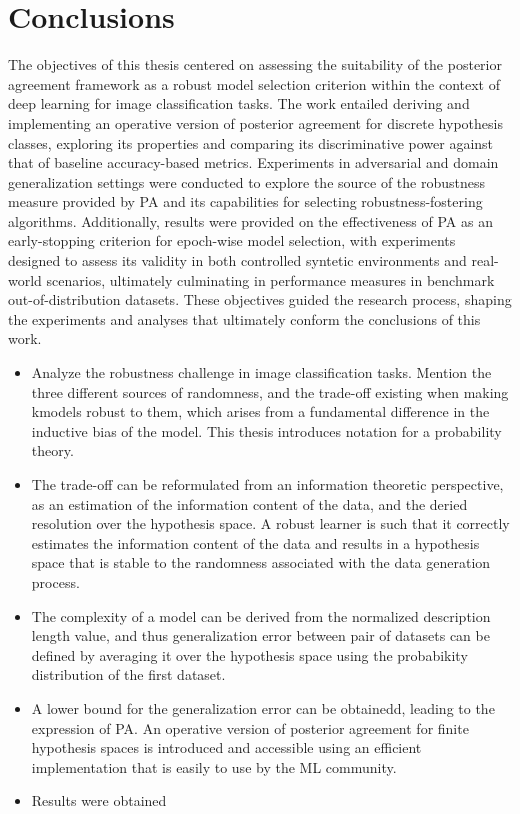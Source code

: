 \chapter{Conclusions}\label{sec:conclusions}

The objectives of this thesis centered on assessing the suitability of the posterior agreement framework 
as a robust model selection criterion within the context of deep learning for image classification tasks. The work entailed 
deriving and implementing an operative version of posterior agreement for discrete hypothesis classes, exploring its 
properties and comparing its discriminative power against that of baseline accuracy-based metrics. Experiments in adversarial 
and domain generalization settings were conducted to explore the source of the robustness measure provided by PA
and its capabilities for selecting robustness-fostering algorithms. Additionally, results were provided on the 
effectiveness of PA as an early-stopping criterion for epoch-wise model selection, with experiments designed to 
assess its validity in both controlled syntetic environments and real-world scenarios, ultimately culminating in 
performance measures in benchmark out-of-distribution datasets. These objectives guided the research process, shaping the 
experiments and analyses that ultimately conform the conclusions of this work. \\



\begin{itemize}
    \item Analyze the robustness challenge in image classification tasks. Mention the three different
    sources of randomness, and the trade-off existing when making kmodels robust to them, which
    arises from a fundamental difference in the inductive bias of the model. This thesis introduces
    notation for a probability theory.\\
    \item The trade-off can be reformulated from an information theoretic perspective, as an estimation
    of the information content of the data, and the deried resolution over the hypothesis space. A robust learner
    is such that it correctly estimates the information content of the data and results in a hypothesis space that
    is stable to the randomness associated with the data generation process.  \\
    \item The complexity of a model can be derived from the normalized description length value, and thus generalization
    error between  pair of datasets can be defined by averaging it over the hypothesis space using the probabikity distribution
    of the first dataset. \\
    \item A lower bound for the generalization error can be obtainedd, leading to the expression of PA. An operative version of
    posterior agreement for finite hypothesis spaces is introduced and accessible using an efficient implementation that is easily
    to use by the ML community. \\
    \item Results were obtained 
\end{itemize}


